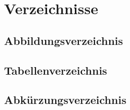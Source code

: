 



\chapter{Verzeichnisse} %




    \section{Abbildungsverzeichnis}
    \section{Tabellenverzeichnis}
    \section{Abkürzungsverzeichnis}











